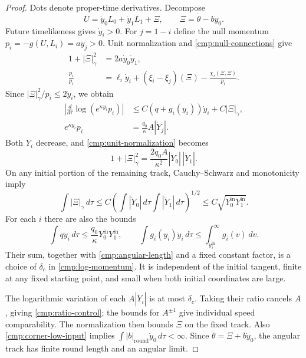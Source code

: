 \begin{proof}
Dots denote proper-time derivatives. Decompose
\[
 U=\dot y_0L_0+\dot y_1L_1+\Xi,
 \qquad \Xi=\dot\theta-b\dot y_0.
\]
Future timelikeness gives $\dot y_i>0$. For $j=1-i$ define the null
momentum $p_i=-g(U,L_i)=a\dot y_j>0$. Unit normalization and
\eqref{cmp:null-connections} give
\begin{align}
 1+|\Xi|_\gamma^2&=2a\dot y_0\dot y_1,
       \label{cmp:unit-normalization}\\
 \frac{\dot p_i}{p_i}
    &=\ell_i\dot y_i+(\xi_i-\xi_j)(\Xi)
                       -\frac{\chi_i(\Xi,\Xi)}{p_i}.
       \label{cmp:momentum-equation}
\end{align}
Since $|\Xi|_\gamma^2/p_i\leq2\dot y_i$, we obtain
\begin{equation}\label{cmp:log-momentum}
 \begin{aligned}
 \left|\frac{d}{d\tau}\log(e^{\kappa y_i}p_i)\right|
   &\leq C(q+g_i(y_i))\dot y_i+C|\Xi|_\gamma,\\
 e^{\kappa y_i}p_i&=\frac{q_0}{\kappa}A|\dot Y_j|.
 \end{aligned}
\end{equation}
Both $Y_i$ decrease, and \eqref{cmp:unit-normalization} becomes
\[
 1+|\Xi|_\gamma^2
       =\frac{2q_0A}{\kappa^2}|\dot Y_0|\,|\dot Y_1|.
\]
On any initial portion of the remaining track, Cauchy--Schwarz and
monotonicity imply
\begin{equation}\label{cmp:angular-length}
 \int|\Xi|_\gamma\,d\tau
   \leq C\left(\int|\dot Y_0|\,d\tau
                    \int|\dot Y_1|\,d\tau\right)^{1/2}
   \leq C\sqrt{Y_0^{\mathrm{in}}Y_1^{\mathrm{in}}}.
\end{equation}
For each $i$ there are also the bounds
\[
 \int q\dot y_i\,d\tau
       \leq\frac{q_0}{\kappa}Y_0^{\mathrm{in}}Y_1^{\mathrm{in}},
 \qquad
 \int g_i(y_i)\dot y_i\,d\tau
       \leq\int_{y_i^{\mathrm{in}}}^{\infty}g_i(v)\,dv.
\]
Their sum, together with \eqref{cmp:angular-length} and a fixed
constant factor, is a choice of $\delta_c$ in
\eqref{cmp:log-momentum}. It is independent of the initial tangent,
finite at any fixed starting point, and small when both initial
coordinates are large.

The logarithmic variation of each $A|\dot Y_i|$ is at most
$\delta_c$. Taking their ratio cancels $A$, giving
\eqref{cmp:ratio-control}; the bounds for $A^{\pm1}$ give individual
speed comparability. The normalization then bounds $\Xi$ on the
fixed track. Also \eqref{cmp:corner-low-input} implies
$\int |b|_{\mathrm{round}}\dot y_0\,d\tau<\infty$.
Since $\dot\theta=\Xi+b\dot y_0$, the angular track has finite round
length and an angular limit.


\end{proof}

